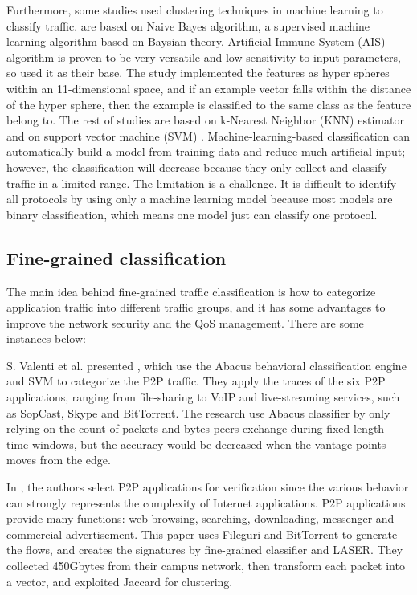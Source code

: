 \documentclass[preprint,12pt]{elsarticle}
\begin{document}
Furthermore, some studies \cite{FPN13, RTC10, AIS14, ASA09, FTC09} used clustering techniques in machine learning to classify traffic. \cite{FPN13, RTC10} are based on Naive Bayes algorithm, a supervised machine learning algorithm based on Baysian theory. Artificial Immune System (AIS) algorithm is proven to be very versatile and low sensitivity to input parameters, so \cite{AIS14} used it as their base. The study implemented the features as hyper spheres within an 11-dimensional space, and if an example vector falls within the distance of the hyper sphere, then the example is classified to the same class as the feature belong to. The rest of studies are based on k-Nearest Neighbor (KNN) estimator \cite{ASA09} and on support vector machine (SVM) \cite{FTC09}. Machine-learning-based classification can automatically build a model from training data and reduce much artificial input; however, the classification will decrease because they only collect and classify traffic in a limited range. The limitation is a challenge. It is difficult to identify all protocols by using only a machine learning model because most models are binary classification, which means one model just can classify one protocol.

  
\subsection{Fine-grained classification}
\label{sec:grained}
The main idea behind fine-grained traffic classification is how to categorize application traffic into different traffic groups, and it has some advantages to improve the network security and the QoS management. There are some instances below:

S. Valenti et al. presented \cite{FBC11}, which use the Abacus behavioral classification engine and SVM to categorize the P2P traffic. They apply the traces of the six P2P applications, ranging from file-sharing to VoIP and live-streaming services, such as SopCast, Skype and BitTorrent. The research use Abacus classifier by only relying on the count of packets and bytes peers exchange during fixed-length time-windows, but the accuracy would be decreased when the vantage points moves from the edge.

In \cite{TFT11}, the authors select P2P applications for verification since the various behavior can strongly represents the complexity of Internet applications. P2P applications provide many functions: web browsing, searching, downloading, messenger and commercial advertisement. This paper uses Fileguri and BitTorrent to generate the flows, and creates the signatures by fine-grained classifier and LASER. They collected 450Gbytes from their campus network, then transform each packet into a vector, and exploited Jaccard for clustering.
\end{document}
